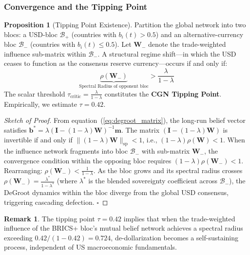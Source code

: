 \documentclass[12pt, letterpaper]{article}
\theoremstyle{definition}
\newtheorem{proposition}{Proposition}
\newtheorem{remark}{Remark}
\begin{document}
\subsubsection{Convergence and the Tipping Point}

\begin{proposition}[Tipping Point Existence]
\label{prop:tipping}
Partition the global network into two blocs: a USD-bloc $\mathcal{B}_+$ (countries with $b_i(t) > 0.5$) and an alternative-currency bloc $\mathcal{B}_-$ (countries with $b_i(t) \leq 0.5$). Let $\mathbf{W}_-$ denote the trade-weighted influence sub-matrix within $\mathcal{B}_-$. A structural regime shift---in which the USD ceases to function as the consensus reserve currency---occurs if and only if:
\begin{equation}
\underbrace{\rho(\mathbf{W}_-)}_{\text{Spectral Radius of opponent bloc}} > \frac{\lambda}{1 - \lambda}
\label{eq:tipping}
\end{equation}
The scalar threshold $\tau_{\text{critic}} = \frac{\lambda}{1-\lambda}$ constitutes the \textbf{CGN Tipping Point}. Empirically, we estimate $\tau = 0.42$.
\end{proposition}

\begin{proof}[Sketch of Proof]
From equation~(\ref{eq:degroot_matrix}), the long-run belief vector satisfies $\mathbf{b}^* = \lambda(\mathbf{I} - (1-\lambda)\mathbf{W})^{-1}\mathbf{m}$. The matrix $(\mathbf{I} - (1-\lambda)\mathbf{W})$ is invertible if and only if $\|(1-\lambda)\mathbf{W}\|_{\text{sp}} < 1$, i.e., $(1-\lambda)\rho(\mathbf{W}) < 1$. When the influence network fragments into bloc $\mathcal{B}_-$ with sub-matrix $\mathbf{W}_-$, the convergence condition within the opposing bloc requires $(1-\lambda)\rho(\mathbf{W}_-) < 1$. Rearranging: $\rho(\mathbf{W}_-) < \frac{1}{1-\lambda}$. As the bloc grows and its spectral radius crosses $\rho(\mathbf{W}_-) = \frac{\lambda^*}{1-\lambda^*}$ (where $\lambda^*$ is the blended sovereignty coefficient across $\mathcal{B}_-$), the DeGroot dynamics within the bloc diverge from the global USD consensus, triggering cascading defection. $\square$
\end{proof}

\begin{remark}
The tipping point $\tau = 0.42$ implies that when the trade-weighted influence of the BRICS+ bloc's mutual belief network achieves a spectral radius exceeding $0.42/(1-0.42) = 0.724$, de-dollarization becomes a self-sustaining process, independent of US macroeconomic fundamentals.
\end{remark}
\end{document}

